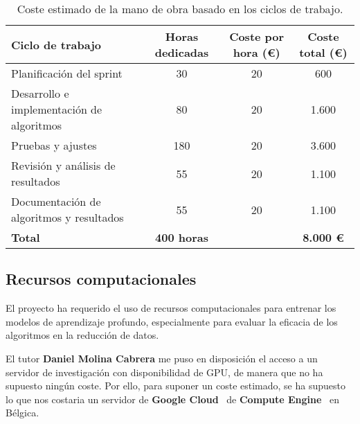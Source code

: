 \begin{table}[htp]\label{tab:mano-de-obra}
    \centering
    \begin{adjustbox}{width=\linewidth}
        \begin{tabular}{|l|c|c|c|}
            \hline
            \textbf{Ciclo de trabajo}                 & \textbf{Horas dedicadas} & \textbf{Coste por hora (€)} &
            \textbf{Coste total (€)}                                                                                              \\ \hline
            Planificación del sprint                  & 30                       & 20                          & 600              \\
            Desarrollo e implementación de algoritmos & 80                       & 20                          & 1.600            \\
            Pruebas y ajustes                         & 180                      & 20                          & 3.600            \\
            Revisión y análisis de resultados         & 55                       & 20                          & 1.100            \\
            Documentación de algoritmos y resultados  & 55                       & 20                          & 1.100            \\ \hline
            \textbf{Total}                            & \textbf{400 horas}       &                             & \textbf{8.000 €} \\ \hline
        \end{tabular}
    \end{adjustbox}
    \caption{Coste estimado de la mano de obra basado en los ciclos de trabajo.}
\end{table}


\subsection{Recursos computacionales}\label{subsec:recursos-computacionales}
El proyecto ha requerido el uso de recursos computacionales para entrenar los modelos de aprendizaje profundo,
especialmente para evaluar la eficacia de los algoritmos en la reducción de datos.


El tutor \textbf{Daniel Molina Cabrera} me puso en disposición el acceso a un servidor de investigación con
disponibilidad de GPU, de manera que no ha supuesto ningún coste.
Por ello, para suponer un coste estimado, se ha supuesto lo que nos costaria un servidor de
\textbf{Google Cloud}~\cite{OverviewGoogleCloud} de \textbf{Compute Engine}~\cite{WhatCloudRun} en
Bélgica.


